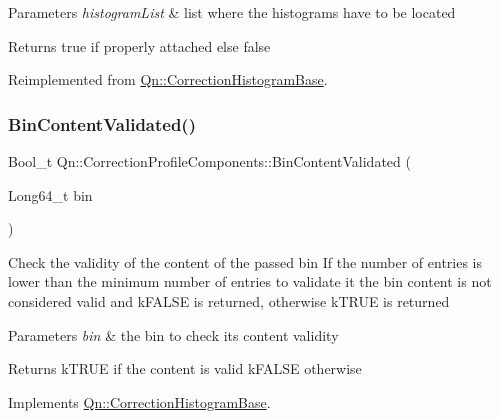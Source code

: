 \begin{DoxyParams}{Parameters}
{\em histogram\+List} & list where the histograms have to be located \\
\hline
\end{DoxyParams}
\begin{DoxyReturn}{Returns}
true if properly attached else false 
\end{DoxyReturn}


Reimplemented from \mbox{\hyperlink{classQn_1_1CorrectionHistogramBase_ad8bcd0079fe5db561780a522e46b7b16}{Qn\+::\+Correction\+Histogram\+Base}}.

\mbox{\label{classQn_1_1CorrectionProfileComponents_a0fd41214d81f38e1a468fba4441e762c}} 
\subsubsection{\texorpdfstring{Bin\+Content\+Validated()}{BinContentValidated()}}
{\footnotesize\ttfamily Bool\+\_\+t Qn\+::\+Correction\+Profile\+Components\+::\+Bin\+Content\+Validated (\begin{DoxyParamCaption}\item[{Long64\+\_\+t}]{bin }\end{DoxyParamCaption})\hspace{0.3cm}{\ttfamily [virtual]}}

Check the validity of the content of the passed bin If the number of entries is lower than the minimum number of entries to validate it the bin content is not considered valid and k\+F\+A\+L\+SE is returned, otherwise k\+T\+R\+UE is returned 
\begin{DoxyParams}{Parameters}
{\em bin} & the bin to check its content validity \\
\hline
\end{DoxyParams}
\begin{DoxyReturn}{Returns}
k\+T\+R\+UE if the content is valid k\+F\+A\+L\+SE otherwise 
\end{DoxyReturn}


Implements \mbox{\hyperlink{classQn_1_1CorrectionHistogramBase_a4db2c92ceaffefaa91475a721612d80d}{Qn\+::\+Correction\+Histogram\+Base}}.

